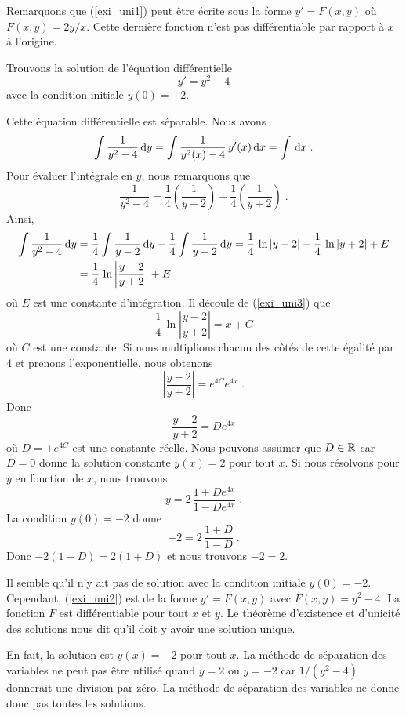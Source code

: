 {\begin{egg}
Remarquons que (\ref{exi_uni1}) peut être écrite sous la forme
$y'= F(x,y)$ où $F(x,y) = 2y/x$.  Cette dernière fonction n'est pas
différentiable par rapport à $x$ à l'origine.
\end{egg}

\begin{egg}
Trouvons la solution de l'équation différentielle
\begin{equation}\label{exi_uni2}
y'= y^2-4
\end{equation}
avec la condition initiale $y(0)=-2$.

Cette équation différentielle est séparable.  Nous avons
\begin{equation}\label{exi_uni3}
\int \frac{1}{y^2-4} \,\mathrm{d}y = \int \frac{1}{y^2(x)-4}\, y'(x) \,\mathrm{d}x
= \int \,\mathrm{d}x \; .
\end{equation}
Pour évaluer l'intégrale en $y$, nous remarquons que
\[
\frac{1}{y^2-4} = \frac{1}{4}\left( \frac{1}{y-2}\right)
 - \frac{1}{4}\left( \frac{1}{y+2} \right) \; .
\]
Ainsi,
\begin{align*}
\int \frac{1}{y^2-4} \,\mathrm{d}y
&= \frac{1}{4} \int \frac{1}{y-2} \,\mathrm{d}y
- \frac{1}{4} \int \frac{1}{y+2} \,\mathrm{d}y
= \frac{1}{4} \, \ln|y-2| - \frac{1}{4}\, \ln|y+2| + E \\
&= \frac{1}{4} \, \ln\left|\frac{y-2}{y+2}\right| + E
\end{align*}
où $E$ est une constante d'intégration.  Il découle de (\ref{exi_uni3})
que
\[
\frac{1}{4} \, \ln\left|\frac{y-2}{y+2}\right| = x + C
\]
où $C$ est une constante.  Si nous multiplions chacun des côtés de cette
égalité par $4$ et prenons l'exponentielle, nous obtenons
\[
\left|\frac{y-2}{y+2}\right| = e^{4C} e^{4x} \; .
\]
Donc
\[
\frac{y-2}{y+2} = D e^{4x}
\]
où $D = \pm e^{4C}$ est une constante réelle.  Nous pouvons assumer que
$D \in \mathbb{R}$ car $D=0$ donne la solution constante $y(x) =2$ pour tout
$x$.  Si nous résolvons pour $y$ en fonction de $x$, nous trouvons
\[
y = 2\,\frac{1+De^{4x}}{1-De^{4x}} \; .
\]
La condition $y(0)=-2$ donne
\[
-2 = 2 \, \frac{1+D}{1-D} \; .
\]
Donc $-2(1-D) = 2(1+D)$ et nous trouvons $-2 = 2$.

Il semble qu'il n'y ait pas de solution avec la condition initiale
$y(0)=-2$.  Cependant, (\ref{exi_uni2}) est de la forme $y'=F(x,y)$
avec $F(x,y) = y^2-4$.  La fonction $F$ est différentiable pour tout
$x$ et $y$.  Le théorème d'existence et d'unicité des solutions nous
dit qu'il doit y avoir une solution unique.

En fait, la solution est $y(x) = -2$ pour tout $x$.  La méthode de
séparation des variables ne peut pas être utilisé quand $y=2$ ou $y=-2$
car $1/(y^2-4)$ donnerait une division par zéro.  La méthode de
séparation des variables ne donne donc pas toutes les solutions.


\end{egg}}
